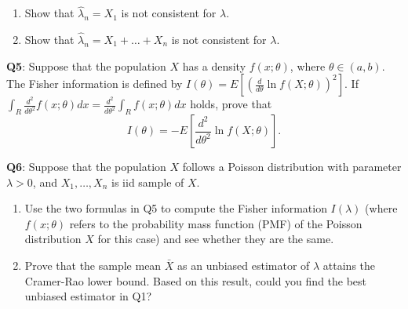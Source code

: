 \documentclass[]{article}
\begin{document}
\begin{enumerate}
\def\labelenumi{(\alph{enumi})}
\item
  Show that \(\hat\lambda_n=X_1\) is not consistent for \(\lambda\).
\item
  Show that \(\hat\lambda_n=X_1+\dots+X_n\) is not consistent for
  \(\lambda\).
\end{enumerate}

\textbf{Q5}: Suppose that the population \(X\) has a density
\(f(x;\theta)\), where \(\theta\in (a,b)\). The Fisher information is
defined by \(I(\theta) = E[(\frac{d}{d\theta}\ln f(X;\theta))^2]\). If
\(\int_R\frac{d^2}{d\theta^2} f(x;\theta)d x = \frac{d^2}{d\theta^2}\int_R f(x;\theta)d x\)
holds, prove that
\[I(\theta)= -E\left[\frac{d^2}{d\theta^2} \ln f(X;\theta)\right].\]

\textbf{Q6}: Suppose that the population \(X\) follows a Poisson
distribution with parameter \(\lambda>0\), and \(X_1,\dots, X_n\) is iid
sample of \(X\).

\begin{enumerate}
\def\labelenumi{\arabic{enumi}.}
\item
  Use the two formulas in Q5 to compute the Fisher information
  \(I(\lambda)\) (where \(f(x;\theta)\) refers to the probability mass
  function (PMF) of the Poisson distribution \(X\) for this case) and
  see whether they are the same.
\item
  Prove that the sample mean \(\bar X\) as an unbiased estimator of
  \(\lambda\) attains the Cramer-Rao lower bound. Based on this result,
  could you find the best unbiased estimator in Q1?
\end{enumerate}
\end{document}
